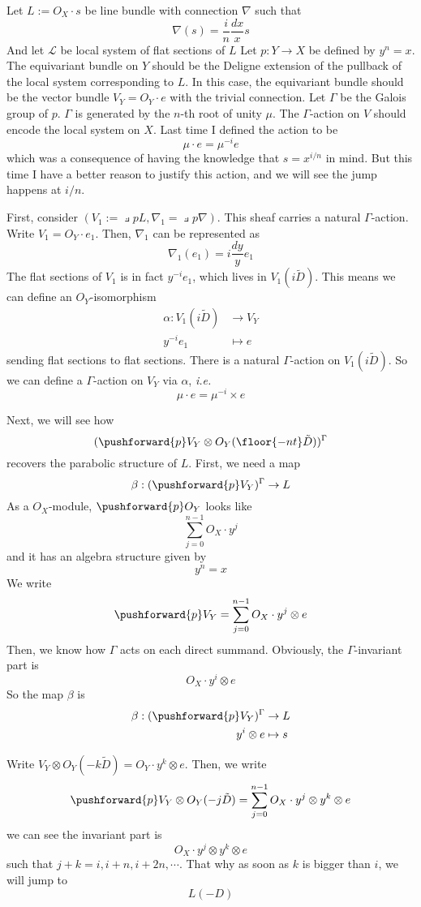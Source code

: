 \documentclass{article}
\begin{document}
\newcommand{\tD}{\tilde{D}}
\renewcommand{\L}{\mathcal{L}}
Let $L :=O_X\cdot s$ be line bundle with connection $\nabla$ such that
\[
    \nabla(s) = \frac{i}{n}\frac{dx}{x}s
\]
And let $\L$ be local system of flat sections of $L$
Let $p: Y \rightarrow X$ be defined by $y^n = x$. The equivariant bundle on $Y$ should
be the Deligne extension of the pullback of the local system corresponding to $L$. 
In this case, the equivariant bundle should be the vector bundle $V_Y = O_Y\cdot e$ with 
the trivial connection. Let $\Gamma$ be the Galois group of $p$. $\Gamma$ is generated
by the $n$-th root of unity $\mu$. The $\Gamma$-action on $V$ should encode the local 
system on $X$. Last time I defined the action to be
\[
    \mu\cdot e = \mu^{-i}e
\]
which was a consequence of having the knowledge that $s = x^{i/n}$ in mind. But this time 
I have a better reason to justify this action, and we will see the jump happens at $i/n$.

First, consider $(V_1 :=\pullback{p}L, \nabla_1 = \pullback{p}\nabla)$. 
This sheaf carries a natural $\Gamma$-action. Write $V_1 = O_Y\cdot e_1$. Then, $\nabla_1$
can be represented as
\[
    \nabla_1(e_1) = i\frac{dy}{y}e_1
\]
The flat sections of $V_1$ is in fact $y^{-i}e_1$, which lives in $V_1(i\tD)$. This means
we can define an $O_Y$-isomorphism
\begin{align*}
    \alpha: V_1(i\tD) & \rightarrow V_Y \\
            y^{-i}e_1 & \mapsto e
\end{align*}
sending flat sections to flat sections. There is a natural $\Gamma$-action on $V_1(i\tD)$.
So we can define a $\Gamma$-action on $V_Y$ via $\alpha$, \emph{i.e.}
\[
    \mu\cdot e = \mu^{-i}\times e
\]

Next, we will see how
\newcommand{\invariant}{(\pushforward{p}V_Y)^{\Gamma}}
\newcommand{\invariantt}{(\pushforward{p}V_Y\otimes O_Y(\floor{-nt}\tD))^{\Gamma}} 
\[
    \invariantt
\]
recovers the parabolic structure of $L$. First, we need a map
\[
    \beta: \invariant \rightarrow L
\]
As a $O_X$-module, $\pushforward{p}O_Y$ looks like
\[
    \sum\limits_{j=0}^{n-1}O_X\cdot y^j
\]
and it has an algebra structure given by
\[
    y^n = x
\]
We write
\[
    \pushforward{p}V_Y = \sum\limits_{j=0}^{n-1}O_X\cdot y^j\otimes e
\]
Then, we know how $\Gamma$ acts on each direct summand. Obviously, the $\Gamma$-invariant part
is 
\[
    O_X\cdot y^i\otimes e
\]
So the map $\beta$ is
\begin{align*}
    \beta: \invariant & \rightarrow L \\
         y^i\otimes e & \mapsto s
\end{align*}


Write $V_Y\otimes O_Y(-k\tD) = O_Y\cdot y^k\otimes e$. Then, we write
\[
    \pushforward{p}V_Y\otimes O_Y(-j\tD) = \sum\limits_{j=0}^{n-1}
        O_X\cdot y^j\otimes y^k\otimes e
\]
we can see the invariant part is
\[
    O_X\cdot y^{j}\otimes y^k\otimes e
\]
such that $j+k = i, i+n, i+2n,\cdots$. That why as soon as $k$ is bigger than $i$, we will
jump to 
\[
    L(-D)
\]
\end{document}
